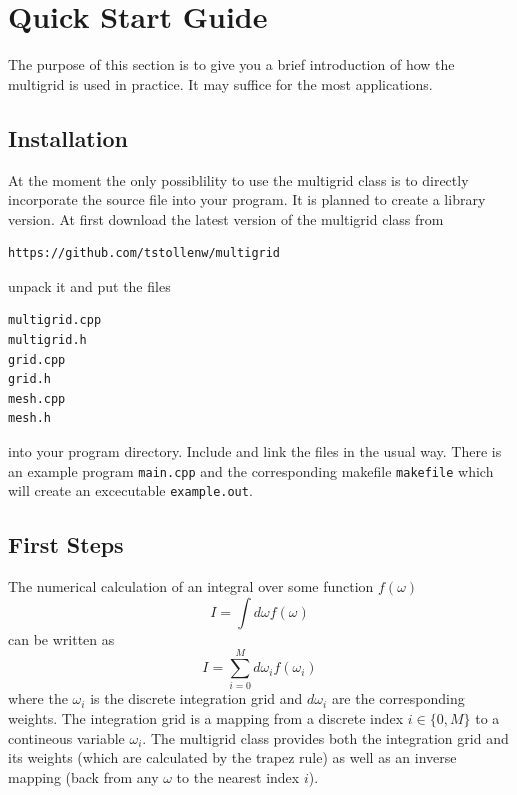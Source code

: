 \documentclass[a4paper]{scrreprt}
\begin{document}
\chapter{Quick Start Guide}
The purpose of this section is to give you a brief introduction of how the multigrid is used in practice. It may suffice for the most applications.

\section{Installation}
At the moment the only possiblility to use the multigrid class is to directly incorporate the source file into your program. It is planned to create a library version. At first download the latest version of the multigrid class from
\begin{lstlisting}[language=bash]
https://github.com/tstollenw/multigrid
\end{lstlisting}
unpack it and put the files
\begin{lstlisting}
multigrid.cpp
multigrid.h
grid.cpp
grid.h
mesh.cpp
mesh.h
\end{lstlisting}
into your program directory. Include and link the files in the usual way. There is an example program \texttt{main.cpp} and the corresponding makefile \texttt{makefile} which will create an excecutable \texttt{example.out}.

\section{First Steps}
The numerical calculation of an integral over some function $f(\omega)$
\[
	I=\int d\omega f(\omega)
\]
can be written as
\[
	I=\sum_{i=0}^M d\omega_i f(\omega_i)
\]
where the $\omega_i$ is the discrete integration grid and $d\omega_i$ are the corresponding weights. The integration grid is a mapping from a discrete index $i\in\{0,M\}$ to a contineous variable $\omega_i$. The multigrid class provides both the integration grid and its weights (which are calculated by the trapez rule) as well as an inverse mapping (back from any $\omega$ to the nearest index $i$).
\end{document}

